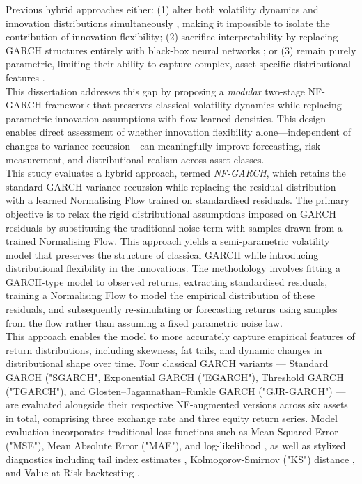 \documentclass[oneside,12pt]{CUEDthesisPSnPDF}
\newcommand{\parencite}{\citep}
\begin{document}
Previous hybrid approaches either: (1) alter both volatility dynamics and innovation distributions simultaneously \parencite{seitz2022garchnf}, making it impossible to isolate the contribution of innovation flexibility; (2) sacrifice interpretability by replacing GARCH structures entirely with black-box neural networks \parencite{bao2017deep}; or (3) remain purely parametric, limiting their ability to capture complex, asset-specific distributional features \parencite{hansen1994autoregressive}.\\

This dissertation addresses this gap by proposing a \emph{modular} two-stage NF-GARCH framework that preserves classical volatility dynamics while replacing parametric innovation assumptions with flow-learned densities. This design enables direct assessment of whether innovation flexibility alone—independent of changes to variance recursion—can meaningfully improve forecasting, risk measurement, and distributional realism across asset classes.\\

This study evaluates a hybrid approach, termed \emph{NF-GARCH}, which retains the standard GARCH variance recursion while replacing the residual distribution with a learned Normalising Flow trained on standardised residuals. The primary objective is to relax the rigid distributional assumptions imposed on GARCH residuals by substituting the traditional noise term with samples drawn from a trained Normalising Flow. This approach yields a semi-parametric volatility model that preserves the structure of classical GARCH while introducing distributional flexibility in the innovations. The methodology involves fitting a GARCH-type model to observed returns, extracting standardised residuals, training a Normalising Flow to model the empirical distribution of these residuals, and subsequently re-simulating or forecasting returns using samples from the flow rather than assuming a fixed parametric noise law.\\ 

This approach enables the model to more accurately capture empirical features of return distributions, including skewness, fat tails, and dynamic changes in distributional shape over time. Four classical GARCH variants — Standard GARCH ("SGARCH", Exponential GARCH ("EGARCH"), Threshold GARCH ("TGARCH"), and Glosten–Jagannathan–Runkle GARCH ("GJR-GARCH") — are evaluated alongside their respective NF-augmented versions across six assets in total, comprising three exchange rate and three equity return series. Model evaluation incorporates traditional loss functions such as Mean Squared Error ("MSE"), Mean Absolute Error ("MAE"), and log-likelihood \parencite{amisano2007comparing}, as well as stylized diagnostics including tail index estimates \parencite{hill1975simple}, Kolmogorov-Smirnov ("KS") distance \parencite{theis2015note}, and Value-at-Risk backtesting \parencite{kupiec1995techniques, christoffersen1998evaluating}.\\
\end{document}
